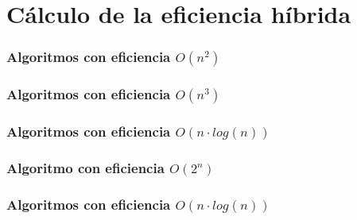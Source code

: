 \documentclass[12pt,spanish]{article}
\begin{document}
\section{Cálculo de la eficiencia híbrida}

\subsubsection{Algoritmos con eficiencia $O(n^2)$}

\subsubsection{Algoritmos con eficiencia $O(n^3)$}

\subsubsection{Algoritmos con eficiencia $O(n \cdot log(n))$}

\subsubsection{Algoritmo con eficiencia $O(2^n)$}

\subsubsection{Algoritmos con eficiencia $O(n \cdot log(n))$}

\end{document}
